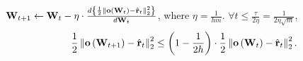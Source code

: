 	\begin{lem}
		\label{lem:logit_l2_loss_parameter_smoothness}
		${\mathbf{W}}_{t+1} \leftarrow {\mathbf{W}}_t - \eta \cdot \frac{d \left\{ \frac{1}{2} \left\| {\mathbf{o}}\left( {\mathbf{W}}_t\right) - \hat{{\mathbf{r}}}_t \right\|_2^2 \right\}}{d {\mathbf{W}}_t}$, where $\eta = \frac{1}{h m}$. $\forall t \le \frac{\tau}{2 \eta} = \frac{1}{2 \eta \sqrt{m}}$,
		\begin{equation*}
		\begin{split}
		\frac{1}{2} \left\| {\mathbf{o}}\left( {\mathbf{W}}_{t+1} \right) - \hat{{\mathbf{r}}}_t \right\|_2^2 \le \left( 1 - \frac{1}{2 h} \right) \cdot \frac{1}{2} \left\| {\mathbf{o}}\left( {\mathbf{W}}_t \right) - \hat{{\mathbf{r}}}_t \right\|_2^2.
		\end{split}
		\end{equation*}
	\end{lem}